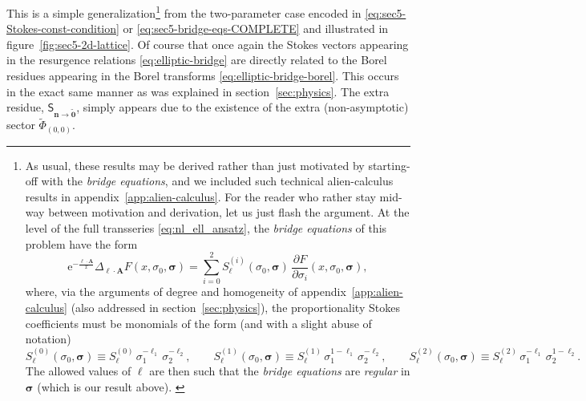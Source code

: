 \documentclass[11pt,a4paper]{article}
\newcommand{\be}{\begin{equation}}
\newcommand{\ee}{\end{equation}}
\newcommand{\rme}{{\mathrm{e}}}
\begin{document}
This is a simple generalization\footnote{As usual, these results may be derived rather than just motivated by starting-off with the \textit{bridge equations}, and we included such technical alien-calculus results in appendix~\ref{app:alien-calculus}. For the reader who rather stay mid-way between motivation and derivation, let us just flash the argument. At the level of the full transseries \eqref{eq:nl_ell_ansatz}, the \textit{bridge equations} of this problem have the form
%
\be
\rme^{- \frac{\boldsymbol{\ell} \cdot \boldsymbol{A}}{x}} \Delta_{\boldsymbol{\ell} \cdot \boldsymbol{A}} F \left( x, \sigma_0, \boldsymbol{\sigma} \right) = \sum_{i=0}^2 S^{(i)}_{\boldsymbol{\ell}} (\sigma_0, \boldsymbol{\sigma})\, \frac{\partial F}{\partial \sigma_i} \left( x, \sigma_0, \boldsymbol{\sigma} \right),
\ee
%
\noindent
where, via the arguments of degree and homogeneity of appendix~\ref{app:alien-calculus} (also addressed in section~\ref{sec:physics}), the proportionality Stokes coefficients must be monomials of the form (and with a slight abuse of notation)
%
\begin{equation}
S^{(0)}_{\boldsymbol{\ell}} (\sigma_0, \boldsymbol{\sigma}) \equiv S^{(0)}_{\boldsymbol{\ell}}\, \sigma_1^{-\ell_1}\, \sigma_2^{-\ell_2},
\qquad
S^{(1)}_{\boldsymbol{\ell}} (\sigma_0, \boldsymbol{\sigma}) \equiv S^{(1)}_{\boldsymbol{\ell}}\, \sigma_1^{1-\ell_1}\, \sigma_2^{-\ell_2},
\qquad
S^{(2)}_{\boldsymbol{\ell}} (\sigma_0, \boldsymbol{\sigma}) \equiv S^{(2)}_{\boldsymbol{\ell}}\, \sigma_1^{-\ell_1}\, \sigma_2^{1-\ell_2}.
\end{equation}
%
\noindent
The allowed values of $\boldsymbol{\ell}$ are then such that the \textit{bridge equations} are \textit{regular} in $\boldsymbol{\sigma}$ (which is our result above).
\label{eq:elliptic-bridge0}} from the two-parameter case encoded in \eqref{eq:sec5-Stokes-const-condition} or \eqref{eq:sec5-bridge-eqs-COMPLETE} and illustrated in figure~\ref{fig:sec5-2d-lattice}. Of course that once again the Stokes vectors appearing in the resurgence relations \eqref{eq:elliptic-bridge} are directly related to the Borel residues appearing in the Borel transforms \eqref{eq:elliptic-bridge-borel}. This occurs in the exact same manner as was explained in section~\ref{sec:physics}. The extra residue, $\mathsf{S}_{\boldsymbol{n} \to \widetilde{\boldsymbol{0}}}$, simply appears due to the existence of the extra (non-asymptotic) sector $\widetilde{\Phi}_{(0,0)}$.
\end{document}
